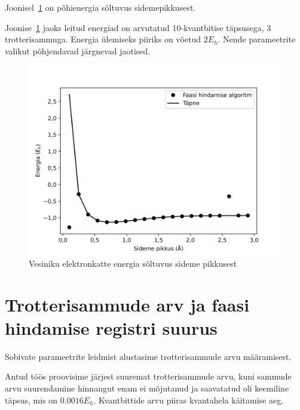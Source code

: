 \documentclass[12pt]{report}
\begin{document}
Joonisel~\ref{fig:scan} on põhienergia sõltuvus sidemepikkusest.

Joonise~\ref{fig:scan} jaoks leitud energiad on arvutatud 10-kvantbitise täpsusega, 3 trotterisammuga.
Energia ülemiseks piiriks on võetud \(2E_h\).
Nende parameetrite valikut põhjendavad järgnevad jaotised.

\begin{figure}[h]
    \centering
    \includegraphics{scan.jpg}
    \caption{Vesiniku elektronkatte energia sõltuvus sideme pikkusest}
    \label{fig:scan}
\end{figure}

\section{Trotterisammude arv ja faasi hindamise registri suurus}

Sobivate parameetrite leidmist alustasime trotterisammude arvu määramisest.

Antud töös proovisime järjest suuremat trotterisammude arvu, kuni sammude arvu suurendamine hinnangut enam ei mõjutanud ja saavatatud oli keemiline täpsus, mis on \(0.0016E_h\).
Kvantbittide arvu piiras kvantahela käitamise aeg.
\end{document}
